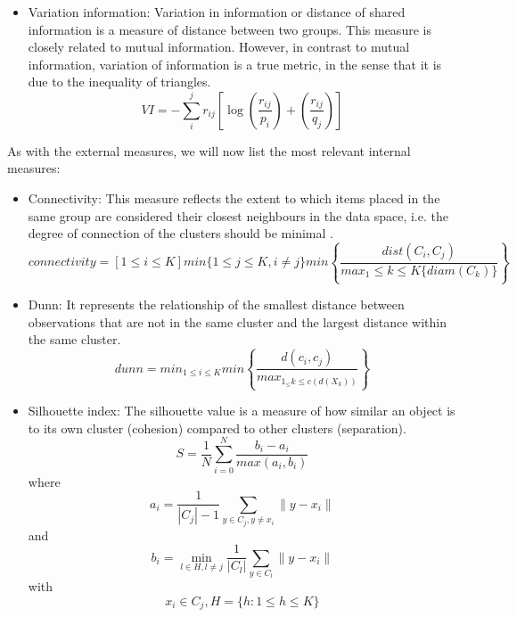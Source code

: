 \begin{itemize}
    \item Variation information: \cite{b43} Variation in information or distance of shared information is a measure of distance between two groups. This measure is closely related to mutual information. However, in contrast to mutual information, variation of information is a true metric, in the sense that it is due to the inequality of triangles.
    \begin{equation}
       VI = - \sum_{i}^{j} r_{ij}\left[\log\left(\frac{r_{ij}}{p_{i}}\right) +\left(\frac{r_{ij}}{q_{j}} \right)\right]
    \end{equation}
\end{itemize}

As with the external measures, we will now list the most relevant internal measures:
\begin{itemize}
    \item Connectivity: This measure reflects the extent to which items placed in the same group are considered their closest neighbours in the data space, i.e. the degree of connection of the clusters should be minimal \cite{b39}.
    \begin{equation}
        connectivity = \left[ 1\leq i \leq K \right]min\{ 1\leq j \leq K, i\not= j \} {min}\left\lbrace \frac{dist(C_i,C_j)}{max_1\leq k \leq K \lbrace diam(C_k) \rbrace }  \right\rbrace\
    \end{equation}
    \item Dunn: \cite{b44} It represents the relationship of the smallest distance between observations that are not in the same cluster and the largest distance within the same cluster.
    \begin{equation}
    dunn = min_{1\leq i \leq K}min \left\lbrace \frac{d(c_i,c_j)}{max_{1_\leq k \leq c(d(X_k))}} \right\rbrace
    \end{equation}
    \item Silhouette index: \cite{b45} The silhouette value is a measure of how similar an object is to its own cluster (cohesion) compared to other clusters (separation).
    \begin{equation}
        S = \frac{1}{N}\sum_{i=0}^{N}\frac{b_{i} - a_{i}}{max(a_{i},b_{i})}
    \end{equation}
    where $$a_{i}=\frac{1}{|C_{j}| - 1} \sum_{y\in C_{j},y\neq x_{i}}^{}\|y-x_{i}\|$$ and
    $$ b_{i} = \min\limits_{l \in H, l\neq j}^{} \frac{1}{|C_{l}|} \sum_{y \in C_{l}}^{} \| y - x_{i} \| $$ with
    $$ x_{i} \in C_{j}, H = \{h: 1 \leq h \leq K\}$$
\end{itemize}

